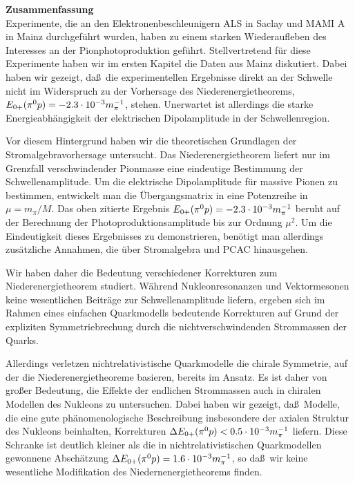 \vspace*{4cm}
{\Huge \bf Zusammenfassung} 
\\[4cm]
Experimente, die an den Elektronenbeschleunigern ALS in Saclay und
MAMI A in Mainz durchgef\"uhrt wurden, haben zu einem starken 
Wiederaufleben des Interesses an der Pionphotoproduktion gef\"uhrt.
Stellvertretend f\"ur diese Experimente haben wir im ersten Kapitel 
die Daten aus Mainz diskutiert. Dabei haben wir gezeigt, da\ss\ die
experimentellen Ergebnisse direkt an der Schwelle nicht im Widerspruch
zu der Vorhersage des Niederenergietheorems, $E_{0+}(\pi^0 p)=-2.3\cdot 10^{-3} m_\pi^{-1}$, stehen. 
Unerwartet ist allerdings die starke Energieabh\"angigkeit der
elektrischen Dipolamplitude in der Schwellenregion. 

Vor diesem Hintergrund haben wir die theoretischen Grundlagen der
Stromalgebravorhersage untersucht. Das Niederenergietheorem liefert
nur im Grenzfall verschwindender Pionmasse eine eindeutige Bestimmung 
der Schwellenamplitude. Um die elektrische Dipolamplitude f\"ur 
massive Pionen zu bestimmen, entwickelt man die \"Ubergangsmatrix in 
eine Potenzreihe in $\mu=m_\pi/M$. Das oben zitierte Ergebnis
$E_{0+}(\pi^0 p)=-2.3\cdot 10^{-3} m_\pi^{-1}$ beruht auf der Berechnung der Photoproduktionsamplitude
bis zur Ordnung $\mu^2$. Um die Eindeutigkeit dieses Ergebnisses zu
demonstrieren, ben\"otigt man allerdings zus\"atzliche Annahmen, 
die \"uber Stromalgebra und PCAC hinausgehen. 

Wir haben daher die Bedeutung verschiedener Korrekturen zum 
Niederenergietheorem studiert. W\"ahrend Nukleonresonanzen und 
Vektormesonen keine wesentlichen Beitr\"age zur Schwellenamplitude 
liefern, ergeben sich im Rahmen eines einfachen Quarkmodells
bedeutende Korrekturen auf Grund der expliziten Symmetriebrechung
durch die nichtverschwindenden Strommassen der Quarks. 

Allerdings verletzen nichtrelativistische Quarkmodelle die chirale
Symmetrie, auf der die Niederenergietheoreme basieren, bereits im
Ansatz. Es ist daher von gro\ss er Bedeutung, die Effekte der 
endlichen Strommassen auch in chiralen Modellen des Nukleons zu
untersuchen. Dabei haben wir gezeigt, da\ss\ Modelle, die eine 
gute ph\"anomenologische Beschreibung insbesondere der axialen
Struktur des Nukleons beinhalten, Korrekturen $\Delta E_{0+}(\pi^0 p) <0.5\cdot 10^{-3} m_\pi^{-1}$
liefern. Diese Schranke ist deutlich kleiner als die in 
nichtrelativistischen Quarkmodellen gewonnene Absch\"atzung
$\Delta E_{0+}(\pi^0 p) =1.6\cdot 10^{-3} m_\pi^{-1}$, so da\ss\ wir keine wesentliche Modifikation 
des Niedernenergietheorems finden.

